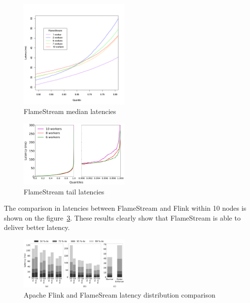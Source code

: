 \begin{figure}[htbp]
  \centering
  \includegraphics[width=0.48\textwidth]{pics/fs-index-median}
  \caption{FlameStream median latencies}
  \label {fs-index-median}
\end{figure}

\begin{figure}[htbp]
  \centering
  \includegraphics[width=0.48\textwidth]{pics/fs-index-quantiles}
  \caption{FlameStream tail latencies}
  \label {fs-index-quantiles}
\end{figure}

The comparison in latencies between FlameStream and Flink within 10 nodes is shown on the figure~\ref{comp-index-quantiles}. These results clearly show that FlameStream is able to deliver better latency.

\begin{figure}[htbp]
  \centering
  \includegraphics[width=0.48\textwidth]{pics/comp-index-quantiles}
  \caption{Apache Flink and FlameSream latency distribution comparison}
  \label {comp-index-quantiles}
\end{figure}
